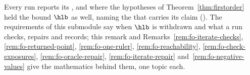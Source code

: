 
Every run reports its , and where the hypotheses of
Theorem~\ref{thm:firstorder} held the  bound $\hlb$ as
well, naming the  that carries its claim
(). The requirements of this submodule say when
$\hlb$ is withdrawn and what a run checks, repairs and records; this remark and
Remarks~\ref{rem:fo-iterate-checks}, \ref{rem:fo-returned-point},
\ref{rem:fo-one-ruler}, \ref{rem:fo-reachability},
\ref{rem:fo-check-exposures}, \ref{rem:fo-oracle-repair},
\ref{rem:fo-iterate-repair} and~\ref{rem:fo-negative-values} give the
mathematics behind them, one topic each.

